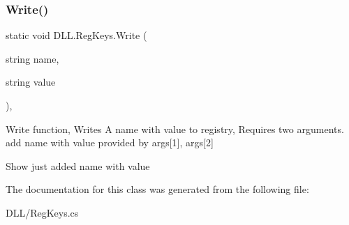 \subsubsection{\texorpdfstring{Write()}{Write()}}
{\footnotesize\ttfamily static void D\+L\+L.\+Reg\+Keys.\+Write (\begin{DoxyParamCaption}\item[{string}]{name,  }\item[{string}]{value }\end{DoxyParamCaption})\hspace{0.3cm}{\ttfamily [inline]}, {\ttfamily [static]}}

Write function, Writes A name with value to registry, Requires two arguments. add name with value provided by args\mbox{[}1\mbox{]}, args\mbox{[}2\mbox{]}

Show just added name with value 

The documentation for this class was generated from the following file\+:\begin{DoxyCompactItemize}
\item 
D\+L\+L/Reg\+Keys.\+cs\end{DoxyCompactItemize}
